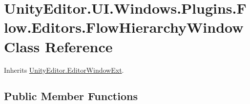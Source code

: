 \hypertarget{class_unity_editor_1_1_u_i_1_1_windows_1_1_plugins_1_1_flow_1_1_editors_1_1_flow_hierarchy_window}{}\section{Unity\+Editor.\+U\+I.\+Windows.\+Plugins.\+Flow.\+Editors.\+Flow\+Hierarchy\+Window Class Reference}
\label{class_unity_editor_1_1_u_i_1_1_windows_1_1_plugins_1_1_flow_1_1_editors_1_1_flow_hierarchy_window}


Inherits \hyperlink{class_unity_editor_1_1_editor_window_ext}{Unity\+Editor.\+Editor\+Window\+Ext}.

\subsection*{Public Member Functions}
